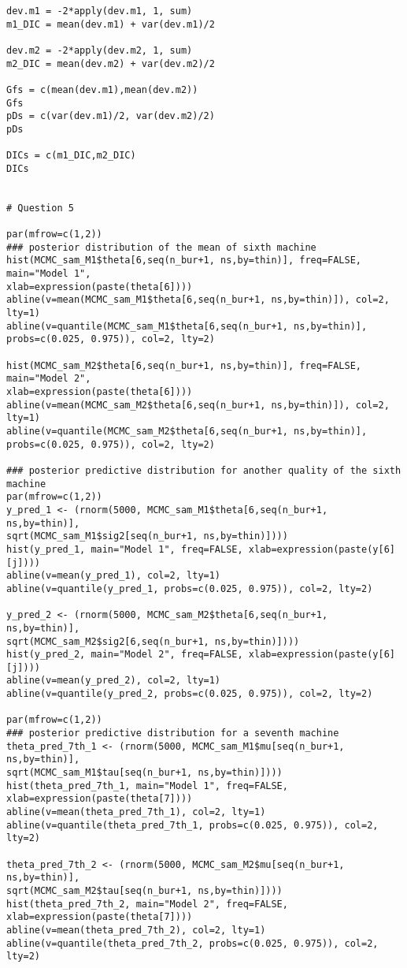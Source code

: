 \documentclass[a4paper, 11pt]{article}
\begin{document}
\begin{verbatim}
dev.m1 = -2*apply(dev.m1, 1, sum)
m1_DIC = mean(dev.m1) + var(dev.m1)/2

dev.m2 = -2*apply(dev.m2, 1, sum)
m2_DIC = mean(dev.m2) + var(dev.m2)/2

Gfs = c(mean(dev.m1),mean(dev.m2))
Gfs
pDs = c(var(dev.m1)/2, var(dev.m2)/2)
pDs

DICs = c(m1_DIC,m2_DIC)
DICs


# Question 5

par(mfrow=c(1,2))
### posterior distribution of the mean of sixth machine
hist(MCMC_sam_M1$theta[6,seq(n_bur+1, ns,by=thin)], freq=FALSE, main="Model 1",
xlab=expression(paste(theta[6])))
abline(v=mean(MCMC_sam_M1$theta[6,seq(n_bur+1, ns,by=thin)]), col=2, lty=1)
abline(v=quantile(MCMC_sam_M1$theta[6,seq(n_bur+1, ns,by=thin)], 
probs=c(0.025, 0.975)), col=2, lty=2)

hist(MCMC_sam_M2$theta[6,seq(n_bur+1, ns,by=thin)], freq=FALSE, main="Model 2",
xlab=expression(paste(theta[6])))
abline(v=mean(MCMC_sam_M2$theta[6,seq(n_bur+1, ns,by=thin)]), col=2, lty=1)
abline(v=quantile(MCMC_sam_M2$theta[6,seq(n_bur+1, ns,by=thin)], 
probs=c(0.025, 0.975)), col=2, lty=2)

### posterior predictive distribution for another quality of the sixth machine
par(mfrow=c(1,2))
y_pred_1 <- (rnorm(5000, MCMC_sam_M1$theta[6,seq(n_bur+1, ns,by=thin)],
sqrt(MCMC_sam_M1$sig2[seq(n_bur+1, ns,by=thin)])))
hist(y_pred_1, main="Model 1", freq=FALSE, xlab=expression(paste(y[6][j])))
abline(v=mean(y_pred_1), col=2, lty=1)
abline(v=quantile(y_pred_1, probs=c(0.025, 0.975)), col=2, lty=2)

y_pred_2 <- (rnorm(5000, MCMC_sam_M2$theta[6,seq(n_bur+1, ns,by=thin)], 
sqrt(MCMC_sam_M2$sig2[6,seq(n_bur+1, ns,by=thin)])))
hist(y_pred_2, main="Model 2", freq=FALSE, xlab=expression(paste(y[6][j])))
abline(v=mean(y_pred_2), col=2, lty=1)
abline(v=quantile(y_pred_2, probs=c(0.025, 0.975)), col=2, lty=2)

par(mfrow=c(1,2))
### posterior predictive distribution for a seventh machine
theta_pred_7th_1 <- (rnorm(5000, MCMC_sam_M1$mu[seq(n_bur+1, ns,by=thin)],
sqrt(MCMC_sam_M1$tau[seq(n_bur+1, ns,by=thin)])))
hist(theta_pred_7th_1, main="Model 1", freq=FALSE, xlab=expression(paste(theta[7])))
abline(v=mean(theta_pred_7th_1), col=2, lty=1)
abline(v=quantile(theta_pred_7th_1, probs=c(0.025, 0.975)), col=2, lty=2)

theta_pred_7th_2 <- (rnorm(5000, MCMC_sam_M2$mu[seq(n_bur+1, ns,by=thin)],
sqrt(MCMC_sam_M2$tau[seq(n_bur+1, ns,by=thin)])))
hist(theta_pred_7th_2, main="Model 2", freq=FALSE, xlab=expression(paste(theta[7])))
abline(v=mean(theta_pred_7th_2), col=2, lty=1)
abline(v=quantile(theta_pred_7th_2, probs=c(0.025, 0.975)), col=2, lty=2)


\end{verbatim}
\end{document}
